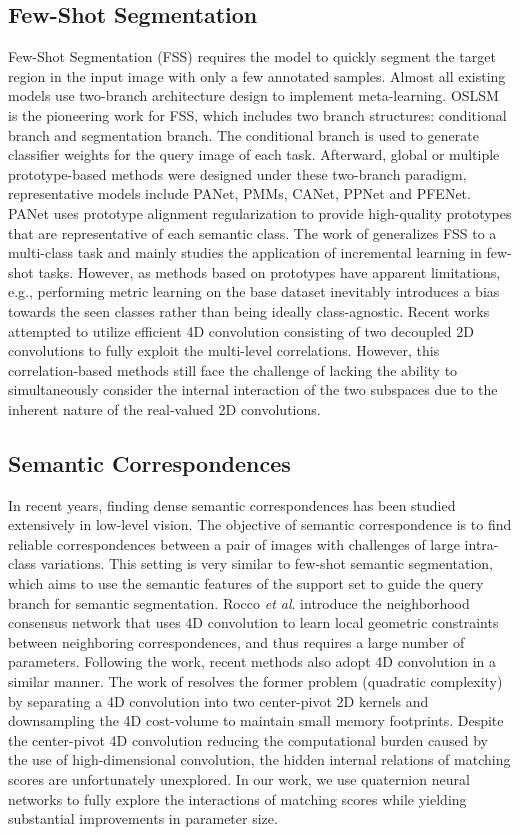 \documentclass[lettersize,journal]{IEEEtran}
\begin{document}
\subsection{Few-Shot Segmentation}
Few-Shot Segmentation (FSS) requires the model to quickly segment the target region in the input image with only a few annotated samples. Almost all existing models use two-branch architecture design to implement meta-learning. OSLSM\cite{RN20} is the pioneering work for FSS, which includes two branch structures: conditional branch and segmentation branch. The conditional branch is used to generate classifier weights for the query image of each task. Afterward, global or multiple prototype-based methods were designed under these two-branch paradigm, representative models include PANet\cite{RN22}, PMMs\cite{RN8}, CANet\cite{RN24}, PPNet\cite{RN7} and PFENet\cite{RN6}. PANet\cite{RN22} uses prototype alignment regularization to provide high-quality prototypes that are representative of each semantic class. The work of \cite{RN64} generalizes FSS to a multi-class task and mainly studies the application of incremental learning in few-shot tasks. However, as methods based on prototypes have apparent limitations, e.g., performing metric learning on the base dataset inevitably introduces a bias towards the seen classes rather than being ideally class-agnostic. Recent works\cite{RN85} attempted to utilize efficient 4D convolution consisting of two decoupled 2D convolutions to fully exploit the multi-level correlations. However, this correlation-based methods still face the challenge of lacking the ability to simultaneously consider the internal interaction of the two subspaces due to the inherent nature of the real-valued 2D convolutions.
\subsection{Semantic Correspondences}
In recent years, finding dense semantic correspondences has been studied extensively in low-level vision. The objective of semantic correspondence is to find reliable correspondences between a pair of images with challenges of large intra-class variations\cite{RN38, RN42, RN40,RN19}. This setting is very similar to few-shot semantic segmentation, which aims to use the semantic features of the support set to guide the query branch for semantic segmentation. Rocco \textit{et al}. \cite{RN19} introduce the neighborhood consensus network that uses 4D convolution to learn local geometric constraints between neighboring correspondences, and thus  requires a large number of parameters. Following the work, recent methods \cite{RN32, RN42} also adopt 4D convolution in a similar manner. The work of \cite{RN38} resolves the former problem (quadratic complexity) by separating a 4D convolution into two center-pivot 2D kernels and downsampling the 4D cost-volume to maintain small memory footprints. Despite the center-pivot 4D convolution reducing the computational burden caused by the use of high-dimensional convolution, the hidden internal relations of matching scores are unfortunately unexplored. In our work, we use quaternion neural networks to fully explore the interactions of matching scores while yielding substantial improvements in parameter size.
\end{document}
